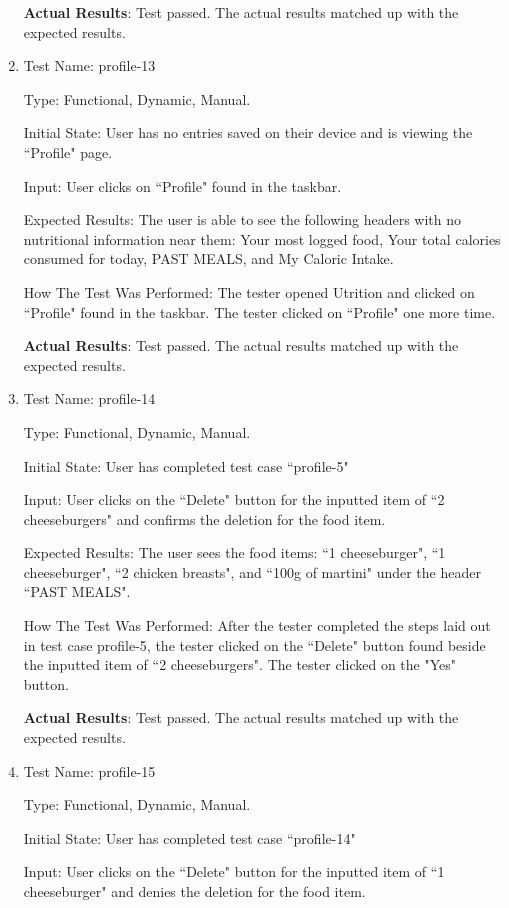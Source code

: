 \documentclass[12pt, titlepage]{article}
\begin{document}
\begin{enumerate}
		\textbf{Actual Results}: Test passed. The actual results matched up with the expected results.
		
		\item{Test Name: profile-13}
		
		Type: Functional, Dynamic, Manual.
		
		Initial State: User has no entries saved on their device and is viewing the ``Profile" page.
		
		Input: User clicks on ``Profile" found in the taskbar.
		
		Expected Results: The user is able to see the following headers with no nutritional information near them: Your most logged food, Your total calories consumed for today, PAST MEALS, and My Caloric Intake.
		
		How The Test Was Performed: The tester opened Utrition and clicked on ``Profile" found in the taskbar. The tester clicked on ``Profile" one more time.
		
		\textbf{Actual Results}: Test passed. The actual results matched up with the expected results.
		
		\item{Test Name: profile-14}
		
		Type: Functional, Dynamic, Manual.
		
		Initial State: User has completed test case ``profile-5"
		
		Input: User clicks on the ``Delete" button for the inputted item of ``2 cheeseburgers" and confirms the deletion for the food item.
		
		Expected Results: The user sees the food items: ``1 cheeseburger", ``1 cheeseburger", ``2 chicken breasts", and ``100g of martini" under the header ``PAST MEALS".
		
		How The Test Was Performed: After the tester completed the steps laid out in test case profile-5, the tester clicked on the ``Delete" button found beside the inputted item of ``2 cheeseburgers". The tester clicked on the "Yes" button.
		
		\textbf{Actual Results}: Test passed. The actual results matched up with the expected results.
		
		\item{Test Name: profile-15}
		
		Type: Functional, Dynamic, Manual.
		
		Initial State: User has completed test case ``profile-14"
		
		Input: User clicks on the ``Delete" button for the inputted item of ``1 cheeseburger" and denies the deletion for the food item.
		

\end{enumerate}
\end{document}

